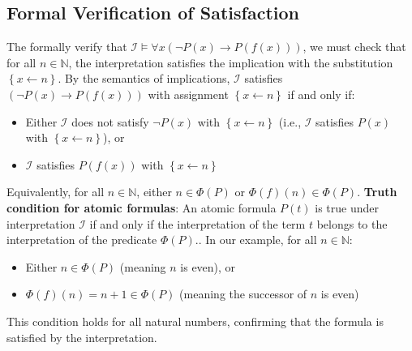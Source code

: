 \documentclass[a4paper]{article}
\theoremstyle{definition}
\begin{document}
\subsection{Formal Verification of Satisfaction}
The formally verify that \( \mathcal{I} \models \forall x (\lnot P(x) \rightarrow P(f(x))) \), we must check that for all \( n \in \mathbb{N} \), the 
interpretation satisfies the implication with the substitution \( \left\{ x \leftarrow n \right\} \).
\vspace{1em}
\noindent
\newline
By the semantics of implications, \( \mathcal{I} \) satisfies \( (\lnot P(x) \rightarrow P(f(x))) \) with assignment \( \left\{ x \leftarrow n \right\} \) if and only if:
\begin{itemize}
	\item Either \( \mathcal{I} \) does not satisfy \( \lnot P(x) \) with \( \left\{ x \leftarrow n \right\} \) (i.e., \( \mathcal{I} \) satisfies \( P(x) \) with \( \left\{ x \leftarrow n \right\} \)), or 
	\item \( \mathcal{I} \) satisfies \( P(f(x)) \) with \( \left\{ x \leftarrow n \right\} \)
\end{itemize}
Equivalently, for all \( n \in \mathbb{N} \), either \( n \in \Phi(P) \) or \( \Phi(f)(n) \in \Phi(P) \).
\vspace{1em}
\noindent
\newline 
\textbf{Truth condition for atomic formulas}: An atomic formula \( P(t) \) is true under interpretation 
\( \mathcal{I} \) if and only if the interpretation of the term \( t \) belongs to the interpretation of the predicate \( \Phi(P) \)..
\vspace{1em}
\noindent
\newline 
In our example, for all \( n \in \mathbb{N} \):
\begin{itemize}
	\item Either \( n \in \Phi(P) \) (meaning \( n \) is even), or 
	\item \( \Phi(f)(n) = n + 1 \in \Phi(P) \) (meaning the successor of \( n \) is even)
\end{itemize}
This condition holds for all natural numbers, confirming that the formula is satisfied by the interpretation.
\end{document}
